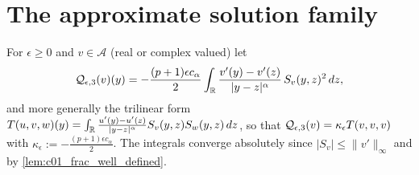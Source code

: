 \section{The approximate solution family}

\begin{definition}
  \label{def:c04_cubic_part}
  For $\epsilon\ge0$ and $v\in\mathcal A$ (real or complex valued) let
  \begin{equation}\label{eqn:approx_cubic_operator}
    \mathcal{Q}_{\epsilon,3}(v)(y)=-\frac{(p+1)\epsilon c_\alpha}2\int_{\mathbb{R}}\frac{v'(y)-v'(z)}{|y-z|^\alpha}\,S_v(y,z)^2\,dz ,
  \end{equation}
  and more generally the trilinear form $T(u,v,w)(y)=\int_{\mathbb{R}}\frac{u'(y)-u'(z)}{|y-z|^\alpha}S_v(y,z)S_w(y,z)\,dz$, so that
  $\mathcal{Q}_{\epsilon,3}(v)=\kappa_\epsilon T(v,v,v)$ with $\kappa_\epsilon:=-\frac{(p+1)\epsilon c_\alpha}2$. The integrals converge absolutely since
  $|S_v|\le\|v'\|_\infty$ and by \cref{lem:c01_frac_well_defined}.
\end{definition}

